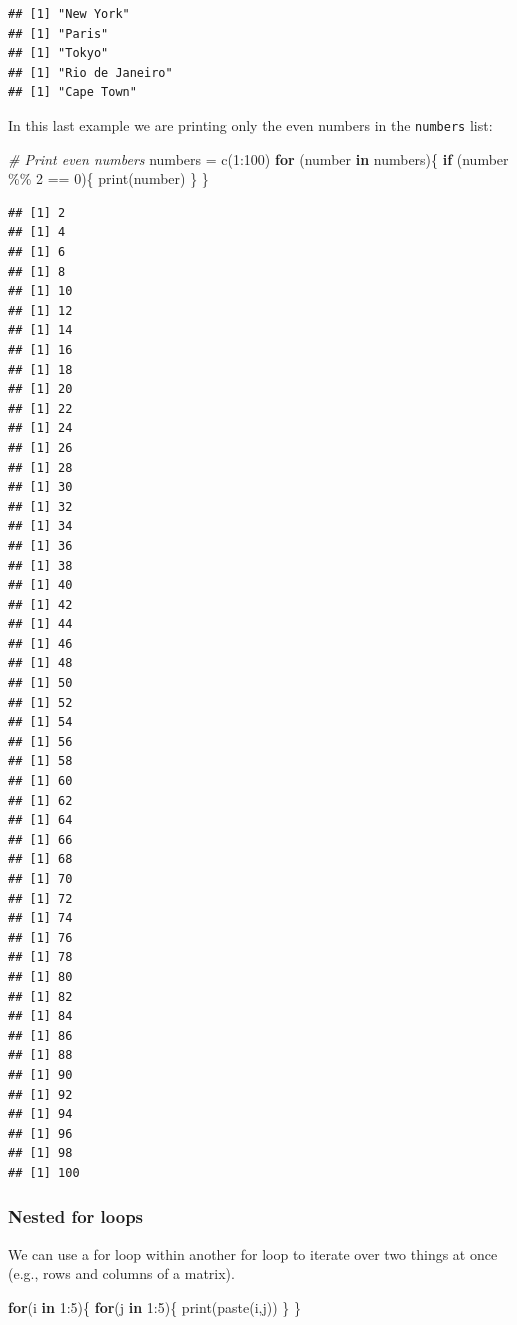 \documentclass[
]{book}
\newenvironment{Shaded}{\begin{snugshade}}{\end{snugshade}}
\newcommand{\CommentTok}[1]{\textcolor[rgb]{0.56,0.35,0.01}{\textit{#1}}}
\newcommand{\ControlFlowTok}[1]{\textcolor[rgb]{0.13,0.29,0.53}{\textbf{#1}}}
\newcommand{\DecValTok}[1]{\textcolor[rgb]{0.00,0.00,0.81}{#1}}
\newcommand{\FunctionTok}[1]{\textcolor[rgb]{0.00,0.00,0.00}{#1}}
\newcommand{\NormalTok}[1]{#1}
\newcommand{\OtherTok}[1]{\textcolor[rgb]{0.56,0.35,0.01}{#1}}
\newcommand{\SpecialCharTok}[1]{\textcolor[rgb]{0.00,0.00,0.00}{#1}}
\begin{document}
\begin{verbatim}
## [1] "New York"
## [1] "Paris"
## [1] "Tokyo"
## [1] "Rio de Janeiro"
## [1] "Cape Town"
\end{verbatim}

In this last example we are printing only the even numbers in the \texttt{numbers} list:

\begin{Shaded}
\begin{Highlighting}[]
\CommentTok{\# Print even numbers}
\NormalTok{numbers }\OtherTok{=} \FunctionTok{c}\NormalTok{(}\DecValTok{1}\SpecialCharTok{:}\DecValTok{100}\NormalTok{)}
\ControlFlowTok{for}\NormalTok{ (number }\ControlFlowTok{in}\NormalTok{ numbers)\{}
    \ControlFlowTok{if}\NormalTok{ (number }\SpecialCharTok{\%\%} \DecValTok{2} \SpecialCharTok{==} \DecValTok{0}\NormalTok{)\{}
        \FunctionTok{print}\NormalTok{(number)}
\NormalTok{    \}}
\NormalTok{\}}
\end{Highlighting}
\end{Shaded}

\begin{verbatim}
## [1] 2
## [1] 4
## [1] 6
## [1] 8
## [1] 10
## [1] 12
## [1] 14
## [1] 16
## [1] 18
## [1] 20
## [1] 22
## [1] 24
## [1] 26
## [1] 28
## [1] 30
## [1] 32
## [1] 34
## [1] 36
## [1] 38
## [1] 40
## [1] 42
## [1] 44
## [1] 46
## [1] 48
## [1] 50
## [1] 52
## [1] 54
## [1] 56
## [1] 58
## [1] 60
## [1] 62
## [1] 64
## [1] 66
## [1] 68
## [1] 70
## [1] 72
## [1] 74
## [1] 76
## [1] 78
## [1] 80
## [1] 82
## [1] 84
## [1] 86
## [1] 88
## [1] 90
## [1] 92
## [1] 94
## [1] 96
## [1] 98
## [1] 100
\end{verbatim}

\hypertarget{nested-for-loops}{%
\subsubsection{Nested for loops}\label{nested-for-loops}}

We can use a for loop within another for loop to iterate over two things at once (e.g., rows and columns of a matrix).

\begin{Shaded}
\begin{Highlighting}[]
\ControlFlowTok{for}\NormalTok{(i }\ControlFlowTok{in} \DecValTok{1}\SpecialCharTok{:}\DecValTok{5}\NormalTok{)\{}
  \ControlFlowTok{for}\NormalTok{(j }\ControlFlowTok{in} \DecValTok{1}\SpecialCharTok{:}\DecValTok{5}\NormalTok{)\{}
    \FunctionTok{print}\NormalTok{(}\FunctionTok{paste}\NormalTok{(i,j))}
\NormalTok{  \}}
\NormalTok{\}}
\end{Highlighting}
\end{Shaded}
\end{document}
